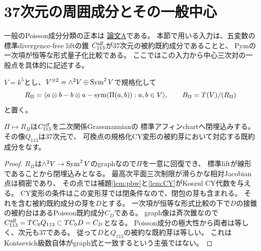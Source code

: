 \section{37次元の周囲成分とその一般中心}
\label{sec:pair-generic-component}
一般のPoisson成分分類の正本は
\href{https://github.com/uedakazushi/nc-cubic/blob/main/papers/paper_a.tex}{論文A}である。
本節で用いる入力は、五変数の標準divergence-free liftの錐
$C_{113}^{\rm aff}$が37次元の被約既約成分であることと、
Pym\cite[Proposition 2.9, Theorem 2.10]{Pym}の一次項が恒等な形式量子化比較である。
ここではこの入力から中心三次対の一般点を具体的に記述する。

$V=k^5$とし、$V^{\otimes2}=\wedge^2V\oplus\operatorname{Sym}^2V$で規格化して
\[
 R_\Pi=\langle a\otimes b-b\otimes a-\operatorname{sym}(\Pi(a,b)):a,b\in V\rangle,
 \qquad B_\Pi=T(V)/(R_\Pi)
\]
と置く。
\begin{proposition}[graph成分の代数的表示]
$\Pi\mapsto R_\Pi$は$C_{113}^{\rm aff}$を二次関係Grassmannianの
標準アフィンchartへ閉埋込みする。その像$Q_{113}$は37次元で、
可換点の規格化CY変形の被約芽において対応する既約成分をなす。
\end{proposition}
\begin{proof}
$R_\Pi$は$\wedge^2V\to\operatorname{Sym}^2V$のgraphなので$\Pi$を一意に回復でき、
標準liftが線形であることから閉埋込みとなる。
最高次平面三次制限が滑らかな相対Jacobian点は稠密であり、
その点では補題\ref{lem:pbw}と\ref{lem:CY}がKoszul CY代数を与える。
CY変形の条件はこの変形芽では閉条件なので、閉包の芽も含まれる。
それを含む被約既約成分の芽を$D$とする。
一次項が恒等な形式比較の下で$D$の接錐の被約台はあるPoisson既約成分$C_D$である。
graph像は斉次錐なので
$C_{113}^{\rm aff}=TC_0Q_{113}\subset TC_0D=C_D$となる。
Poisson成分の極大性から両者は等しく、次元も37である。
従って$D$と$Q_{113}$の被約な既約芽は等しい。
これはKontsevich級数自体がgraph式と一致するという主張ではない。
\end{proof}

